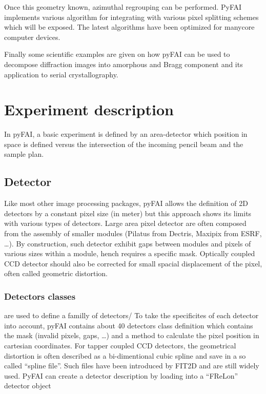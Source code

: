 \documentclass[preprint]{iucr}
\begin{document}
Once this geometry known, azimuthal regrouping can be performed. 
PyFAI implements various algorithm for integrating with various pixel splitting
schemes which will be exposed. 
The latest algorithms have been optimized for
manycore computer devices.

Finally some scientific examples are given on how pyFAI can be used to decompose 
diffraction images into amorphous and Bragg component and its application
to serial crystallography.
 
\section{Experiment description}
In pyFAI, a basic experiment is defined by an area-detector which position in
space is defined versus the intersection of the incoming pencil beam and the
sample plan.

\subsection{Detector}
Like most other image processing packages, pyFAI allows the definition of 2D
detectors by a constant pixel size (in meter) but this approach shows its limits
with various types of detectors.
Large area pixel detector are often composed from the assembly of smaller
modules (Pilatus from Dectris, Maxipix from ESRF, \ldots). 
By construction, such detector exhibit gaps between modules and pixels of
various sizes within a module, hench requires a specific mask.
Optically coupled CCD detector should also be corrected
for small spacial displacement of the pixel, often called geometric distortion.

\subsubsection{Detectors classes} are used to define a familly of detectors/ 
To take the specificites of each detector into account, pyFAI contains about
40 detectors class definition which contains the mask (invalid pixels, gaps,
\ldots) and a method to calculate the pixel position in cartesian coordinates.
For tapper coupled CCD detectors, the geometrical distortion is often
described as a bi-dimentional cubic spline and save in a so called ``spline
file''. 
Such files have been introduced by FIT2D \cite{fit2d} and are still widely
used. PyFAI can create a detector description by loading into a ``FReLon''
detector object
\end{document}
